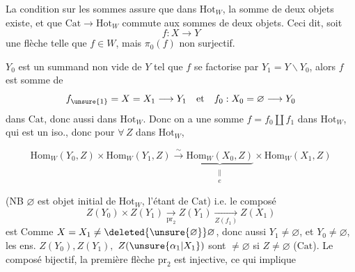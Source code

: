 La condition sur les sommes assure que dans $\mathrm{Hot}_W$, la somme de deux objets existe, et que $\mathrm{Cat}\to\mathrm{Hot}_W$ commute aux sommes de deux objets. Ceci dit, soit
\[ f:X\longrightarrow Y \]
une flèche telle que $f\in W$, mais $\pi_0(f)$ non surjectif. 


 $Y_0$ est un summand non vide de $Y$ tel que $f$ se factorise par $Y_1=Y\smallsetminus Y_0$, alors $f$ est  somme de
\[ f_{\unsure{1}}=X=X_1\longrightarrow Y_1\quad\text{et}\quad f_0:X_0=\varnothing\longrightarrow Y_0 \]
dans $\mathrm{Cat}$, donc aussi dans $\mathrm{Hot}_W$. Donc on a une somme $f=f_0\amalg f_1$ dans $\mathrm{Hot}_W$, qui est un iso., donc pour $\forall\,Z$ dans $\mathrm{Hot}_W$,

\[ \mathrm{Hom}_W(Y_0,Z)\times\mathrm{Hom}_W(Y_1,Z)
 \xrightarrow{\sim}\underbrace{\mathrm{Hom}_W(X_0,Z)}_{\substack{\parallel\\ e}}\times\mathrm{Hom}_W(X_1,Z) \]

(NB $\varnothing$ est objet initial de $\mathrm{Hot}_W$, l'étant de $\mathrm{Cat}$) i.e. le composé
\[ Z(Y_0)\times Z(Y_1)\xrightarrow[\mathrm{pr}_2]{}Z(Y_1)\xrightarrow[Z(f_1)]{}Z(X_1) \]
est  Comme $X=X_1\ne\deleted{\unsure{\varnothing}}\varnothing$, donc aussi $Y_1\ne\varnothing$, et $Y_0\ne\varnothing$,  les ens. $Z(Y_0),Z(Y_1),$ $Z(\unsure{\alpha_1|X_1})$ sont $\ne\varnothing$ si $Z\ne\varnothing$ ($\mathrm{Cat}$).  Le composé  bijectif, la première flèche $\mathrm{pr}_2$ est injective, ce qui implique
